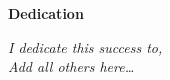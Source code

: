 \pagestyle{plain}
\null\vfil
\begin{center}{\huge{\textbf{Dedication}}}\end{center}
\vspace{0.5cm}
\begin{center}
\large{\textit{
I dedicate this success to,\\
Add all others here\dots}}
\end{center}

\vfil\null
\clearpage


